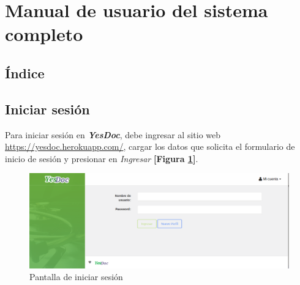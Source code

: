 \section{Manual de usuario del sistema completo}
\label{manual_usuario}


\subsection*{Índice}
\startcontents

\newpage
\clearpage

\subsection{Iniciar sesión}
\begin{sloppypar}
Para iniciar sesión en \textbf{\textit{YesDoc}}, debe ingresar al sitio web \url{https://yesdoc.herokuapp.com/}, cargar los datos que solicita el formulario de inicio de sesión y presionar en \textit{Ingresar} \textbf{[Figura \ref{mu-iniciar_sesion}]}.
\end{sloppypar}
 \begin{figure}
 	\centering
 	\includegraphics[width=.8\textwidth]{img/manual_de_usuario/iniciar_sesion}
 	\caption{Pantalla de iniciar sesión}
 	\label{mu-iniciar_sesion}
 \end{figure}

